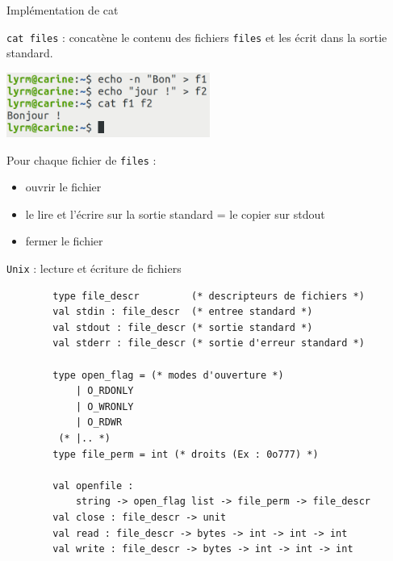 \begin{frame}{Implémentation de cat}

    \texttt{cat files} : concatène le contenu des fichiers \texttt{files} et les écrit dans la sortie standard.
    
    
    \includegraphics[width=0.5\textwidth]{slides/images/shell_cat.png}
    
    \pause{}

    Pour chaque fichier de \texttt{files} : 
    \begin{itemize}[label=\small{}]
        \item ouvrir le fichier
        \item le lire et l'écrire sur la sortie standard = le copier sur stdout
        \item fermer le fichier
    \end{itemize}
\end{frame}

\begin{frame}[fragile]{\texttt{Unix} : lecture et écriture de fichiers}
    \begin{lstlisting}
        type file_descr         (* descripteurs de fichiers *)
        val stdin : file_descr  (* entree standard *)
        val stdout : file_descr (* sortie standard *)
        val stderr : file_descr (* sortie d'erreur standard *)
        
        type open_flag = (* modes d'ouverture *)
            | O_RDONLY 
            | O_WRONLY 
            | O_RDWR 
         (* |.. *)
        type file_perm = int (* droits (Ex : 0o777) *)
        
        val openfile : 
            string -> open_flag list -> file_perm -> file_descr
        val close : file_descr -> unit
        val read : file_descr -> bytes -> int -> int -> int
        val write : file_descr -> bytes -> int -> int -> int
    \end{lstlisting}
\end{frame}

